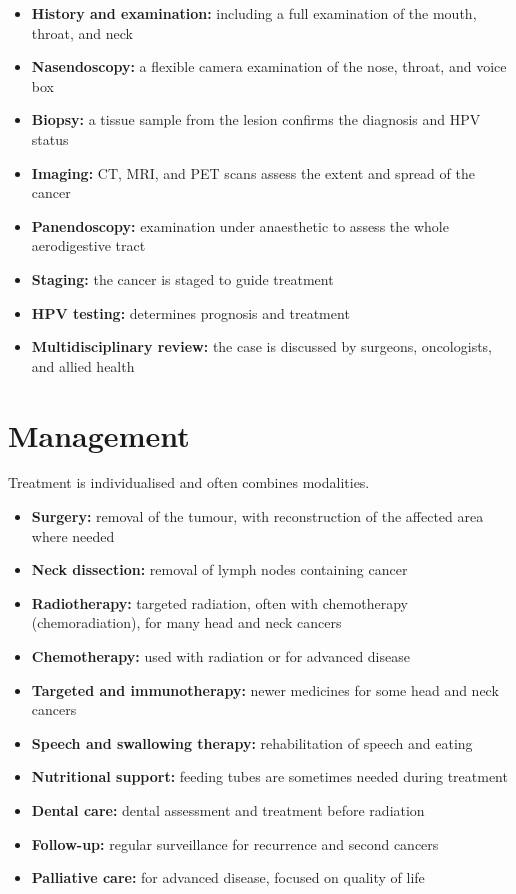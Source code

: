\begin{itemize}
    \item \textbf{History and examination:} including a full examination of the mouth, throat, and neck
    \item \textbf{Nasendoscopy:} a flexible camera examination of the nose, throat, and voice box
    \item \textbf{Biopsy:} a tissue sample from the lesion confirms the diagnosis and HPV status
    \item \textbf{Imaging:} CT, MRI, and PET scans assess the extent and spread of the cancer
    \item \textbf{Panendoscopy:} examination under anaesthetic to assess the whole aerodigestive tract
    \item \textbf{Staging:} the cancer is staged to guide treatment
    \item \textbf{HPV testing:} determines prognosis and treatment
    \item \textbf{Multidisciplinary review:} the case is discussed by surgeons, oncologists, and allied health
\end{itemize}

\section*{Management}
Treatment is individualised and often combines modalities.

\begin{itemize}
    \item \textbf{Surgery:} removal of the tumour, with reconstruction of the affected area where needed
    \item \textbf{Neck dissection:} removal of lymph nodes containing cancer
    \item \textbf{Radiotherapy:} targeted radiation, often with chemotherapy (chemoradiation), for many head and neck cancers
    \item \textbf{Chemotherapy:} used with radiation or for advanced disease
    \item \textbf{Targeted and immunotherapy:} newer medicines for some head and neck cancers
    \item \textbf{Speech and swallowing therapy:} rehabilitation of speech and eating
    \item \textbf{Nutritional support:} feeding tubes are sometimes needed during treatment
    \item \textbf{Dental care:} dental assessment and treatment before radiation
    \item \textbf{Follow-up:} regular surveillance for recurrence and second cancers
    \item \textbf{Palliative care:} for advanced disease, focused on quality of life
\end{itemize}

